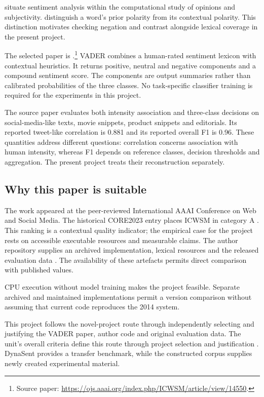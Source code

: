 \documentclass[11pt]{article}
\begin{document}
\citet{pang2008opinion} situate sentiment analysis within the computational
study of opinions and subjectivity. \citet{wilson2005contextual} distinguish a
word's prior polarity from its contextual polarity. This distinction motivates
checking negation and contrast alongside lexical coverage in the present project.

The selected paper is \citet{hutto2014vader}.\footnote{Source paper:
\url{https://ojs.aaai.org/index.php/ICWSM/article/view/14550}.}
VADER combines a human-rated sentiment lexicon with contextual heuristics. It
returns positive, neutral and negative components and a compound sentiment score.
The components are output summaries rather than calibrated probabilities of the
three classes. No task-specific classifier training is required for the
experiments in this project.

The source paper evaluates both intensity association and three-class decisions
on social-media-like texts, movie snippets, product snippets and editorials. Its
reported tweet-like correlation is 0.881 and its reported overall F1 is 0.96.
These quantities address different questions: correlation concerns association
with human intensity, whereas F1 depends on reference classes, decision thresholds
and aggregation. The present project treats their reconstruction separately.

\subsection{Why this paper is suitable}
The work appeared at the peer-reviewed International AAAI Conference on Web and
Social Media. The historical CORE2023 entry places ICWSM in category A
\citep{core2023}. This ranking is a contextual quality indicator; the empirical
case for the project rests on accessible executable resources and measurable
claims. The author repository supplies an archived implementation, lexical
resources and the released evaluation data \citep{huttoCode}. The availability of
these artefacts permits direct comparison with published values.

CPU execution without model training makes the project feasible. Separate archived
and maintained implementations permit a version comparison without assuming that
current code reproduces the 2014 system.

This project follows the novel-project route through independently selecting and
justifying the VADER paper, author code and original evaluation data. The unit's
overall criteria define this route through project selection and justification
\citep{courseCriteria2026}. DynaSent provides a transfer benchmark, while the
constructed corpus supplies newly created experimental material.
\end{document}
